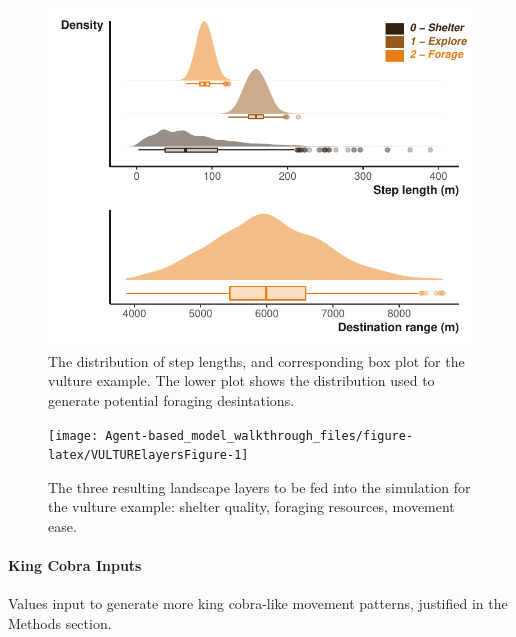 \documentclass[10pt,a4paper]{article}
\begin{document}
\begin{figure}

{\centering \includegraphics{Agent-based_model_walkthrough_files/figure-latex/VULTUREsettingMoveDesPlot-1} 

}

\caption{The distribution of step lengths, and corresponding box plot for the vulture example. The lower plot shows the distribution used to generate potential foraging desintations.}\label{fig:VULTUREsettingMoveDesPlot}
\end{figure}

\begin{figure}

{\centering \texttt{[image: Agent-based\_model\_walkthrough\_files/figure-latex/VULTURElayersFigure-1]} 

}

\caption{The three resulting landscape layers to be fed into the simulation for the vulture example: shelter quality, foraging resources, movement ease.}\label{fig:VULTURElayersFigure}
\end{figure}

\hypertarget{king-cobra-inputs}{%
\paragraph{King Cobra Inputs}\label{king-cobra-inputs}}

Values input to generate more king cobra-like movement patterns, justified in the Methods section.
\end{document}
